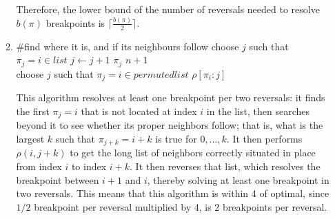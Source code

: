 \documentclass[a4paper]{article}
\begin{document}
\begin{enumerate}
\begin{enumerate}
	Therefore, the lower bound of the number of reversals needed to resolve $b(\pi)$ breakpoints is $\lceil \frac{b(\pi)}{2} \rceil$.
	\item
	\begin{algorithmic}
				\State \#find where it is, and if its neighbours follow
				\State choose $j$ such that $\pi_j = i \in list$
					\State $j \gets j+1$
				\EndWhile
				\Return $\pi_j$
			\EndIf
		\EndFor
		\Return $n+1$
	\EndFunction\\
		\State choose $j$ such that $\pi_j = i \in permutedlist$
		\State $\rho[\pi_i:j]$
	\EndWhile
	\end{algorithmic}
	This algorithm resolves at least one breakpoint per two reversals: it finds the first $\pi_j = i$ that is not located at index $i$ in the list, then searches beyond it to see whether its proper neighbors follow; that is, what is the largest $k$ such that $\pi_{j+k} = i+k$ is true for $0, ..., k$.  It then performs $\rho(i, j+k)$ to get the long list of neighbors correctly situated in place from index $i$ to index $i+k$.  It then reverses that list, which resolves the breakpoint between $i+1$ and $i$, thereby solving at least one breakpoint in two reversals.  This means that this algorithm is within 4 of optimal, since $1/2$ breakpoint per reversal multiplied by $4$, is $2$ breakpoints per reversal.
	\end{enumerate}
\end{enumerate}
\end{document}
